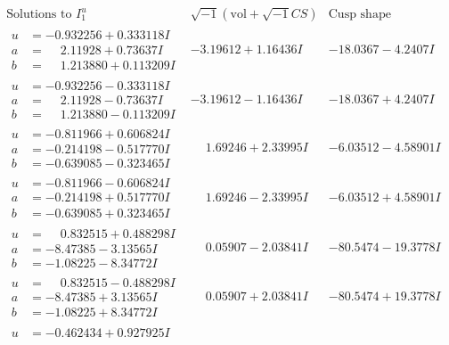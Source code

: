 \documentclass[1p]{elsarticle_modified}
\theoremstyle{definition}
\newcommand{\I}{\sqrt{-1}}
\begin{document}
$$\begin{array}{c|c|c}  
\text{Solutions to }I^u_{1}& \I (\text{vol} + \sqrt{-1}CS) & \text{Cusp shape}\\
 \hline 
\begin{aligned}
u &= -0.932256 + 0.333118 I \\
a &= \phantom{-}2.11928 + 0.73637 I \\
b &= \phantom{-}1.213880 + 0.113209 I\end{aligned}
 & -3.19612 + 1.16436 I & -18.0367 - 4.2407 I \\ \hline\begin{aligned}
u &= -0.932256 - 0.333118 I \\
a &= \phantom{-}2.11928 - 0.73637 I \\
b &= \phantom{-}1.213880 - 0.113209 I\end{aligned}
 & -3.19612 - 1.16436 I & -18.0367 + 4.2407 I \\ \hline\begin{aligned}
u &= -0.811966 + 0.606824 I \\
a &= -0.214198 - 0.517770 I \\
b &= -0.639085 - 0.323465 I\end{aligned}
 & \phantom{-}1.69246 + 2.33995 I & -6.03512 - 4.58901 I \\ \hline\begin{aligned}
u &= -0.811966 - 0.606824 I \\
a &= -0.214198 + 0.517770 I \\
b &= -0.639085 + 0.323465 I\end{aligned}
 & \phantom{-}1.69246 - 2.33995 I & -6.03512 + 4.58901 I \\ \hline\begin{aligned}
u &= \phantom{-}0.832515 + 0.488298 I \\
a &= -8.47385 - 3.13565 I \\
b &= -1.08225 - 8.34772 I\end{aligned}
 & \phantom{-}0.05907 - 2.03841 I & -80.5474 - 19.3778 I \\ \hline\begin{aligned}
u &= \phantom{-}0.832515 - 0.488298 I \\
a &= -8.47385 + 3.13565 I \\
b &= -1.08225 + 8.34772 I\end{aligned}
 & \phantom{-}0.05907 + 2.03841 I & -80.5474 + 19.3778 I \\ \hline\begin{aligned}
u &= -0.462434 + 0.927925 I \\

\end{aligned}
\end{array}$$
\end{document}
